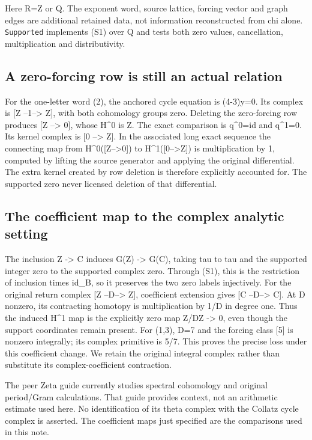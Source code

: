 Here R=Z or Q. The exponent word, source lattice, forcing vector and
graph edges are additional retained data, not information reconstructed
from chi alone. \nolinkurl{Supported} implements (S1) over Q and tests
both zero values, cancellation, multiplication and distributivity.

\subsection{A zero-forcing row is still an actual relation}

For the one-letter word (2), the anchored cycle equation is (4-3)y=0.
Its complex is {[}Z --1--\textgreater{} Z{]}, with both cohomology
groups zero. Deleting the zero-forcing row produces {[}Z
--\textgreater{} 0{]}, whose H\^{}0 is Z. The exact comparison is
q\^{}0=id and q\^{}1=0. Its kernel complex is {[}0 --\textgreater{}
Z{]}. In the associated long exact sequence the connecting map from
H\^{}0({[}Z--\textgreater0{]}) to H\^{}1({[}0--\textgreater Z{]}) is
multiplication by 1, computed by lifting the source generator and
applying the original differential. The extra kernel created by row
deletion is therefore explicitly accounted for. The supported zero never
licensed deletion of that differential.

\subsection{The coefficient map to the complex analytic setting}

The inclusion Z -\textgreater{} C induces G(Z) -\textgreater{} G(C),
taking tau to tau and the supported integer zero to the supported
complex zero. Through (S1), this is the restriction of inclusion times
id\_B, so it preserves the two zero labels injectively. For the original
return complex {[}Z --D--\textgreater{} Z{]}, coefficient extension
gives {[}C --D--\textgreater{} C{]}. At D nonzero, its contracting
homotopy is multiplication by 1/D in degree one. Thus the induced H\^{}1
map is the explicitly zero map Z/DZ -\textgreater{} 0, even though the
support coordinates remain present. For (1,3), D=7 and the forcing class
{[}5{]} is nonzero integrally; its complex primitive is 5/7. This proves
the precise loss under this coefficient change. We retain the original
integral complex rather than substitute its complex-coefficient
contraction.

The peer Zeta guide currently studies spectral cohomology and original
period/Gram calculations. That guide provides context, not an arithmetic
estimate used here. No identification of its theta complex with the
Collatz cycle complex is asserted. The coefficient maps just specified
are the comparisons used in this note.

